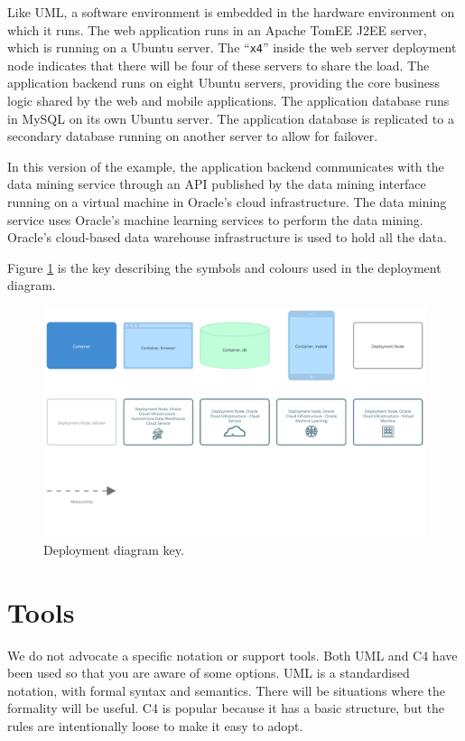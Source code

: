Like UML, a software environment is embedded in the hardware environment on which it runs.
The web application runs in an Apache TomEE J2EE server, which is running on a Ubuntu server.
The ``\texttt{x4}'' inside the web server deployment node indicates that there will be four of these servers to share the load.
The application backend runs on eight Ubuntu servers, providing the core business logic shared by the web and mobile applications.
The application database runs in MySQL on its own Ubuntu server.
The application database is replicated to a secondary database running on another server to allow for failover.

In this version of the example, the application backend communicates with the data mining service
through an API published by the data mining interface running on a virtual machine in Oracle's cloud infrastructure.
The data mining service uses Oracle's machine learning services to perform the data mining.
Oracle's cloud-based data warehouse infrastructure is used to hold all the data.

Figure \ref{fig:c4_deployment_key} is the key describing the symbols and colours used in the deployment diagram.

\begin{figure}[h!]
    \centering
    \begin{adjustwidth}{-5mm}{-5mm}
        \includegraphics[trim=22 210 22 24,clip,width=0.92\paperwidth]{images/c4/deployment_diagram-key.png}
    \end{adjustwidth}
    \caption{Deployment diagram key.}
    \label{fig:c4_deployment_key}
\end{figure}

\section{Tools}
We do not advocate a specific notation or support tools.
Both UML and C4 have been used so that you are aware of some options.
UML is a standardised notation, with formal syntax and semantics.
There will be situations where the formality will be useful.
C4 is popular because it has a basic structure, but the rules are intentionally loose to make it easy to adopt.

